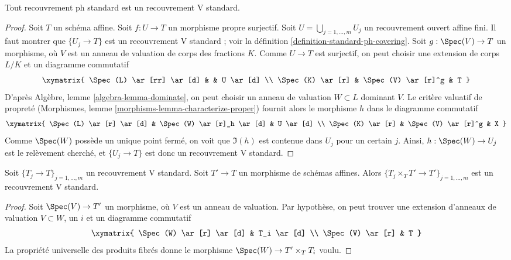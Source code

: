 \begin{lemma}
\label{lemma-standard-ph-standard-V}
Tout recouvrement ph standard est un recouvrement V standard.
\end{lemma}

\begin{proof}
Soit $T$ un schéma affine. Soit $f : U \to T$ un morphisme propre
surjectif. Soit $U = \bigcup_{j = 1, \ldots, m} U_j$ un recouvrement ouvert
affine fini. Il faut montrer que $\{U_j \to T\}$ est un recouvrement V
standard ; voir la définition
\ref{definition-standard-ph-covering}.
Soit $g : \Spec(V) \to T$
un morphisme, où $V$ est un anneau de valuation de corps des fractions $K$.
Comme $U \to T$ est surjectif, on peut choisir une extension de corps
$L/K$ et un diagramme commutatif
$$
\xymatrix{
\Spec(L) \ar[rr] \ar[d] & & U \ar[d] \\
\Spec(K) \ar[r] & \Spec(V) \ar[r]^g & T
}
$$
D'après Algèbre, lemme \ref{algebra-lemma-dominate}, on peut choisir un anneau
de valuation $W \subset L$ dominant $V$. Le critère valuatif de
propreté (Morphismes, lemme \ref{morphisms-lemma-characterize-proper})
fournit alors le morphisme $h$ dans le diagramme
commutatif
$$
\xymatrix{
\Spec(L) \ar[r] \ar[d] & \Spec(W) \ar[r]_h \ar[d] & U \ar[d] \\
\Spec(K) \ar[r] & \Spec(V) \ar[r]^g & X
}
$$
Comme $\Spec(W)$ possède un unique point fermé, on voit que $\Im(h)$
est contenue dans $U_j$ pour un certain $j$. Ainsi, $h : \Spec(W) \to U_j$
est le relèvement cherché, et $\{U_j \to T\}$ est donc un recouvrement V standard.
\end{proof}

\begin{lemma}
\label{lemma-base-change-standard-V}
Soit $\{T_j \to T\}_{j = 1, \ldots, m}$ un recouvrement V standard.
Soit $T' \to T$ un morphisme de schémas affines.
Alors $\{T_j \times_T T' \to T'\}_{j = 1, \ldots, m}$ est un
recouvrement V standard.
\end{lemma}

\begin{proof}
Soit $\Spec(V) \to T'$ un morphisme, où $V$ est un anneau de valuation.
Par hypothèse, on peut trouver une extension d'anneaux de valuation $V \subset W$,
un $i$ et un diagramme commutatif
$$
\xymatrix{
\Spec(W) \ar[r] \ar[d] & T_i \ar[d] \\
\Spec(V) \ar[r] & T
}
$$
La propriété universelle des produits fibrés
donne le morphisme $\Spec(W) \to T' \times_T T_i$
voulu.
\end{proof}

